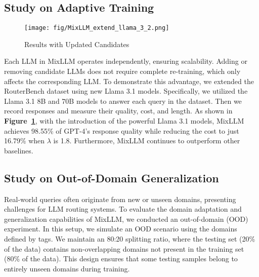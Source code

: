\subsection{Study on Adaptive Training}

\begin{figure}[htbp]
\centering
\texttt{[image: fig/MixLLM\_extend\_llama\_3\_2.png]}
\caption{Results with Updated Candidates}
\label{mixllm_extend}
\end{figure}

Each LLM in MixLLM operates independently, ensuring scalability. Adding or removing candidate LLMs does not require complete re-training, which only affects the corresponding LLM. To demonstrate this advantage, we extended the RouterBench dataset using new Llama 3.1 models. Specifically, we utilized the Llama 3.1 8B and 70B models to answer each query in the dataset. Then we record responses and measure their quality, cost, and length. 
As shown in \textbf{Figure~\ref{mixllm_extend}},
with the introduction of the powerful Llama 3.1 models, MixLLM achieves 98.55\% of GPT-4's response quality while reducing the cost to just 16.79\% when $\lambda$ is 1.8. Furthermore, MixLLM continues to outperform other baselines. 





\subsection{Study on Out-of-Domain Generalization}
\label{sec:ood_study}
Real-world queries often originate from new or unseen domains, presenting challenges for LLM routing systems. To evaluate the domain adaptation and generalization capabilities of MixLLM, we conducted an out-of-domain (OOD) experiment. In this setup, we simulate an OOD scenario using the domains defined by tags. 
We maintain an 80:20 splitting ratio, where the testing set (20\% of the data) contains non-overlapping domains not present in the training set (80\% of the data). This design ensures that some testing samples belong to entirely unseen domains during training.

